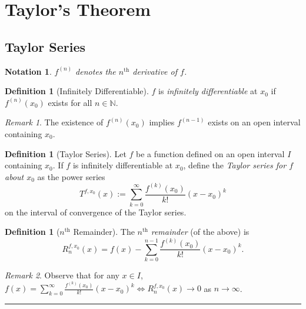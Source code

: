 \documentclass[12pt, lettersize]{book}
\theoremstyle{plain}
\newtheorem{nte}[thm]{Notation}
\theoremstyle{definition}
\newtheorem{dfn}[thm]{Definition}
\theoremstyle{remark}
\newtheorem*{rem}{Remark}
\newcommand{\N}{\mathbb{N}}
\newcommand{\lline}{\noindent\rule{\textwidth}{1pt}}
\begin{document}
		\section{Taylor's Theorem}
		\subsection*{Taylor Series}
			\begin{nte}
				$f^{(n)}$ denotes the $n^\text{th}$ derivative of $f$.
			\end{nte}
			
			\begin{dfn}[Infinitely Differentiable]
				$f$ is \emph{infinitely differentiable} at $x_0$ if $f^{(n)}(x_0)$ exists for all $n\in\N$.
			\end{dfn}
			\begin{rem}
				The existence of $f^{(n)}(x_0)$ implies $f^{(n-1)}$ exists on an open interval containing $x_0$.
			\end{rem}
			
			\begin{dfn}[Taylor Series]
				Let $f$ be a function defined on an open interval $I$ containing $x_0$. If $f$ is infinitely differentiable at $x_0$, define the \emph{Taylor series for $f$ about $x_0$} as the power series
				\begin{displaymath}
					T^{f,x_0}(x):=\sum_{k=0}^{\infty}\frac{f^{(k)}(x_0)}{k!}(x-x_0)^k
				\end{displaymath}
				on the interval of convergence of the Taylor series.
			\end{dfn}
		
			\begin{dfn}[$n^\text{th}$ Remainder]
			The $n^\text{th}$ \emph{remainder} (of the above) is 
			\begin{displaymath}
				R_n^{f,x_0}(x)=f(x)-\sum_{k=0}^{n-1}\frac{f^{(k)}(x_0)}{k!}(x-x_0)^k.
			\end{displaymath}
			\end{dfn}
			\begin{rem}
				Observe that for any $x\in I$, $f(x)=\sum_{k=0}^{\infty}\frac{f^{(k)}(x_0)}{k!}(x-x_0)^k\iff R_n^{f,x_0}(x)\rightarrow0$ as $n\rightarrow\infty$.
			\end{rem}
			\lline
			\newpage
\end{document}
